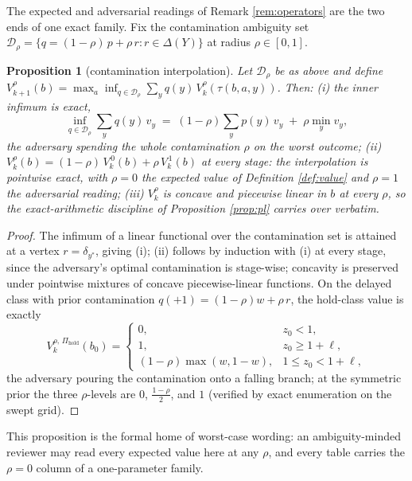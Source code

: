 \documentclass[10pt,twocolumn]{article}
\theoremstyle{plain}
\newtheorem{proposition}[theorem]{Proposition}
\theoremstyle{definition}
\theoremstyle{remark}
\begin{document}
The expected and adversarial readings of Remark \ref{rem:operators} are
the two ends of one exact family. Fix the contamination ambiguity set
\(\mathcal{D}_{\rho} = \{q = (1 - \rho)\,p + \rho\, r : r \in
\Delta(Y)\}\) at radius \(\rho \in [0, 1]\).

\begin{proposition}[contamination interpolation]\label{prop:dr}
Let \(\mathcal{D}_{\rho}\) be as above and define
\(V^{\rho}_{k+1}(b) = \max_{a}\inf_{q \in \mathcal{D}_{\rho}}
\sum_{y} q(y)\, V^{\rho}_{k}(\tau(b, a, y))\). Then:
(i) the inner infimum is exact,
\[
\inf_{q \in \mathcal{D}_{\rho}} \textstyle\sum_{y} q(y)\, v_{y}
\;=\; (1 - \rho) \sum_{y} p(y)\, v_{y} \;+\; \rho \min_{y} v_{y},
\]
the adversary spending the whole contamination \(\rho\) on the worst
outcome;
(ii) \(V^{\rho}_{k}(b) = (1 - \rho)\, V^{\,0}_{k}(b) + \rho\,
V^{\,1}_{k}(b)\) at every stage: the interpolation is pointwise exact,
with \(\rho = 0\) the expected value of Definition \ref{def:value}
and \(\rho = 1\) the adversarial reading;
(iii) \(V^{\rho}_{k}\) is concave and piecewise linear in \(b\) at
every \(\rho\), so the exact-arithmetic discipline of Proposition
\ref{prop:pl} carries over verbatim.
\end{proposition}

\begin{proof}
The infimum of a linear functional over the contamination set is attained
at a vertex \(r = \delta_{y^{*}}\), giving (i); (ii) follows by
induction with (i) at every stage, since the adversary's optimal
contamination is stage-wise; concavity is preserved under pointwise
mixtures of concave piecewise-linear functions. On the delayed class
with prior contamination \(q(+1) = (1 - \rho)w + \rho\, r\), the
hold-class value is exactly
\[
V^{\rho,\, \Pi_{\mathrm{hold}}}_{k}(b_{0}) =
\begin{cases} 0, & z_{0} < 1,\\
1, & z_{0} \ge 1 + \ell,\\
(1 - \rho) \max(w, 1 - w), & 1 \le z_{0} < 1 + \ell,
\end{cases}
\]
the adversary pouring the contamination onto a falling branch; at the
symmetric prior the three \(\rho\)-levels are \(0\), \(
\tfrac{1 - \rho}{2}\), and \(1\) (verified by exact enumeration on
the swept grid).
\end{proof} This proposition is the formal home of worst-case
wording: an ambiguity-minded reviewer may read every expected value here
at any \(\rho\), and every table carries the \(\rho = 0\) column of
a one-parameter family.
\end{document}
